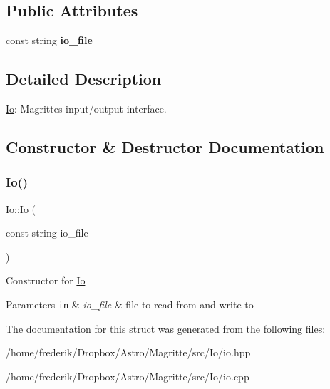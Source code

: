 \subsection*{Public Attributes}
\begin{DoxyCompactItemize}
\item 
\mbox{\label{structIo_ad39461ed5b16c4fa74363a2a593d12e3}} 
const string {\bfseries io\+\_\+file}
\end{DoxyCompactItemize}


\subsection{Detailed Description}
\mbox{\hyperlink{structIo}{Io}}\+: Magritte\textquotesingle{}s input/output interface. 

\subsection{Constructor \& Destructor Documentation}
\mbox{\label{structIo_a5d9ad9b1887a715c69a8dce3e967f8d2}} 
\subsubsection{\texorpdfstring{Io()}{Io()}}
{\footnotesize\ttfamily Io\+::\+Io (\begin{DoxyParamCaption}\item[{const string}]{io\+\_\+file }\end{DoxyParamCaption})}

Constructor for \mbox{\hyperlink{structIo}{Io}} 
\begin{DoxyParams}[1]{Parameters}
\mbox{\tt in}  & {\em io\+\_\+file} & file to read from and write to \\
\hline
\end{DoxyParams}


The documentation for this struct was generated from the following files\+:\begin{DoxyCompactItemize}
\item 
/home/frederik/\+Dropbox/\+Astro/\+Magritte/src/\+Io/io.\+hpp\item 
/home/frederik/\+Dropbox/\+Astro/\+Magritte/src/\+Io/io.\+cpp\end{DoxyCompactItemize}
